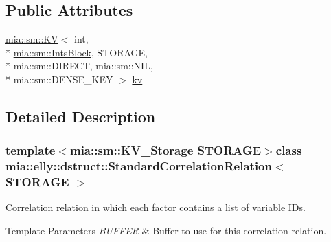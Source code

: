 \subsection*{Public Attributes}
\begin{DoxyCompactItemize}
\item 
\hyperlink{classmia_1_1sm_1_1_k_v}{mia\-::sm\-::\-K\-V}$<$ int, \\*
\hyperlink{classmia_1_1sm_1_1_ints_block}{mia\-::sm\-::\-Ints\-Block}, S\-T\-O\-R\-A\-G\-E, \\*
mia\-::sm\-::\-D\-I\-R\-E\-C\-T, mia\-::sm\-::\-N\-I\-L, \\*
mia\-::sm\-::\-D\-E\-N\-S\-E\-\_\-\-K\-E\-Y $>$ \hyperlink{classmia_1_1elly_1_1dstruct_1_1_standard_correlation_relation_ac3c97abf0391b1bd326ca769e2f6b992}{kv}
\end{DoxyCompactItemize}


\subsection{Detailed Description}
\subsubsection*{template$<$mia\-::sm\-::\-K\-V\-\_\-\-Storage S\-T\-O\-R\-A\-G\-E$>$class mia\-::elly\-::dstruct\-::\-Standard\-Correlation\-Relation$<$ S\-T\-O\-R\-A\-G\-E $>$}

Correlation relation in which each factor contains a list of variable I\-Ds. 


\begin{DoxyTemplParams}{Template Parameters}
{\em B\-U\-F\-F\-E\-R} & Buffer to use for this correlation relation. \\
\hline
\end{DoxyTemplParams}


